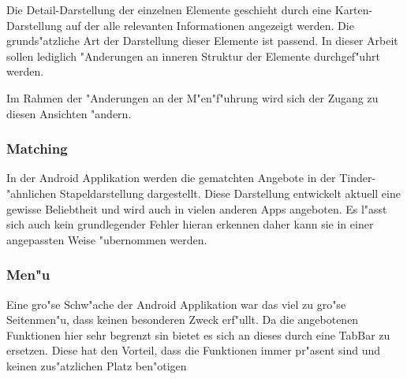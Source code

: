 Die Detail-Darstellung der einzelnen Elemente geschieht durch eine Karten-Darstellung auf der alle relevanten Informationen angezeigt werden.
Die grunds"atzliche Art der Darstellung dieser Elemente ist passend.
In dieser Arbeit sollen lediglich "Anderungen an inneren Struktur der Elemente durchgef"uhrt werden.

Im Rahmen der "Anderungen an der M"en"f"uhrung wird sich der Zugang zu diesen Ansichten "andern.

\subsubsection*{Matching}

In der Android Applikation werden die gematchten Angebote in der Tinder-"ahnlichen Stapeldarstellung dargestellt. 
Diese Darstellung entwickelt aktuell eine gewisse Beliebtheit und wird auch in vielen anderen Apps angeboten.
Es l"asst sich auch kein grundlegender Fehler hieran erkennen daher kann sie in einer angepassten Weise "ubernommen werden.

\subsubsection*{Men"u}

Eine gro"se Schw"ache der Android Applikation war das viel zu gro"se Seitenmen"u, dass keinen besonderen Zweck erf"ullt. 
Da die angebotenen Funktionen hier sehr begrenzt sin bietet es sich an dieses durch eine TabBar zu ersetzen. 
Diese hat den Vorteil, dass die Funktionen immer pr"asent sind und keinen zus"atzlichen Platz ben"otigen
